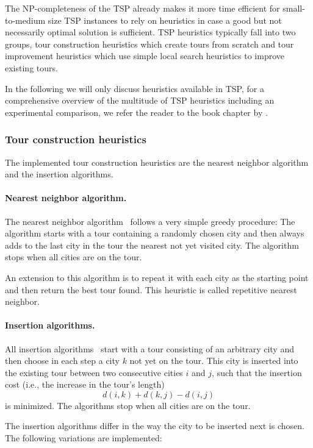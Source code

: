 \documentclass[10pt,a4paper,fleqn]{article}
\newcommand{\strong}[1]{{\normalfont\fontseries{b}\selectfont #1}}
\newcommand{\pkg}[1]{\strong{#1}}
\begin{document}
The NP-completeness of the TSP already makes it more time efficient for
small-to-medium size TSP instances to rely on heuristics in case a good
but not necessarily optimal solution is sufficient.  TSP heuristics
typically fall into two groups, tour construction heuristics which
create tours from scratch and tour improvement heuristics which use
simple local search heuristics to improve existing tours.

In the following we will only discuss heuristics available in \pkg{TSP}, for a
comprehensive overview of the multitude of TSP heuristics including an
experimental comparison, we refer the reader to the book chapter by
\cite{Johnson2002}.

\subsubsection{Tour construction heuristics}
The implemented tour construction heuristics are the nearest neighbor algorithm
and the insertion algorithms.

\paragraph{Nearest neighbor algorithm.}

The nearest neighbor algorithm~\citep{Rosenkrantz1977} follows a very
simple greedy procedure:  The algorithm starts with a tour containing a
randomly chosen city and then always adds to the last city in the tour
the nearest not yet visited city. The algorithm stops when all cities
are on the tour.

An extension to this algorithm is to repeat it with each city as the
starting point and then return the best tour found.  This heuristic is
called repetitive nearest neighbor.

\paragraph{Insertion algorithms.}

All insertion algorithms~\citep{Rosenkrantz1977} start with a tour
consisting of an arbitrary city and then choose in each step a city $k$
not yet on the tour.  This city is inserted into the existing tour
between two consecutive cities $i$ and $j$, such that the insertion cost
(i.e., the increase in the tour's length)
$$d(i,k) + d(k,j) - d(i,j)$$ 
is minimized.  The algorithms stop when all cities are on the tour.

The insertion algorithms differ in the way the city to be inserted next
is chosen.  The following variations are implemented:
\end{document}
